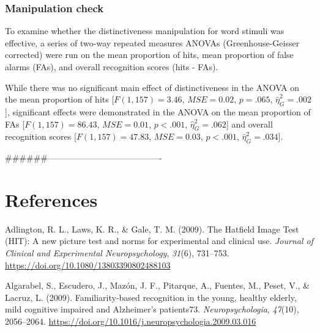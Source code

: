 \documentclass[
  11pt,
]{article}
\begin{document}
\hypertarget{manipulation-check}{%
\subsubsection{Manipulation check}\label{manipulation-check}}

To examine whether the distinctiveness manipulation for word stimuli was
effective, a series of two-way repeated measures ANOVAs
(Greenhouse-Geisser corrected) were run on the mean proportion of hits,
mean proportion of false alarms (FAs), and overall recognition scores
(hits - FAs).

While there was no significant main effect of distinctiveness in the
ANOVA on the mean proportion of hits {[}\(F(1, 157) = 3.46\),
\(\mathit{MSE} = 0.02\), \(p = .065\), \(\hat{\eta}^2_G = .002\){]},
significant effects were demonstrated in the ANOVA on the mean
proportion of FAs {[}\(F(1, 157) = 86.43\), \(\mathit{MSE} = 0.01\),
\(p < .001\), \(\hat{\eta}^2_G = .062\){]} and overall recognition
scores {[}\(F(1, 157) = 47.83\), \(\mathit{MSE} = 0.03\), \(p < .001\),
\(\hat{\eta}^2_G = .034\){]}.

\newpage

\#\#\#\#\#\#----------------------------------------

\newpage

\hypertarget{references}{%
\section{References}\label{references}}

\setlength{\parindent}{-0.2in}
\setlength{\leftskip}{0.2in}
\setlength{\parskip}{8pt}

\noindent

\hypertarget{refs}{}
\leavevmode\hypertarget{ref-adlington2009}{}%
Adlington, R. L., Laws, K. R., \& Gale, T. M. (2009). The Hatfield Image
Test (HIT): A new picture test and norms for experimental and clinical
use. \emph{Journal of Clinical and Experimental Neuropsychology},
\emph{31}(6), 731--753. \url{https://doi.org/10.1080/13803390802488103}

\leavevmode\hypertarget{ref-algarabel2009}{}%
Algarabel, S., Escudero, J., Mazón, J. F., Pitarque, A., Fuentes, M.,
Peset, V., \& Lacruz, L. (2009). Familiarity-based recognition in the
young, healthy elderly, mild cognitive impaired and Alzheimer's
patients73. \emph{Neuropsychologia}, \emph{47}(10), 2056--2064.
\url{https://doi.org/10.1016/j.neuropsychologia.2009.03.016}
\end{document}
